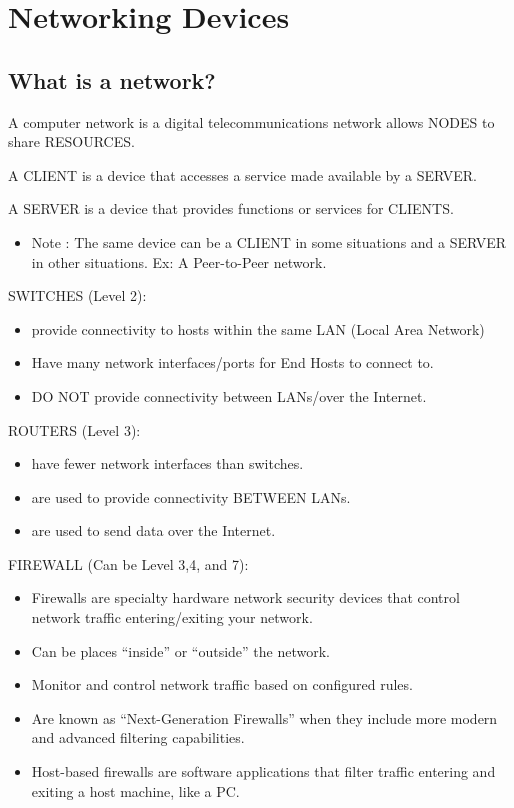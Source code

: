 \chapter{Networking Devices}\label{networking-devices}

\section{What is a network?}\label{what-is-a-network}

A computer network is a digital telecommunications network allows NODES
to share RESOURCES.

A CLIENT is a device that accesses a service made available by a SERVER.

A SERVER is a device that provides functions or services for CLIENTS.

\begin{itemize}
\tightlist
\item
  Note : The same device can be a CLIENT in some situations and a SERVER
  in other situations. Ex: A Peer-to-Peer network.
\end{itemize}

SWITCHES (Level 2):

\begin{itemize}
\tightlist
\item
  provide connectivity to hosts within the same LAN (Local Area Network)
\item
  Have many network interfaces/ports for End Hosts to connect to.
\item
  DO NOT provide connectivity between LANs/over the Internet.
\end{itemize}

ROUTERS (Level 3):

\begin{itemize}
\tightlist
\item
  have fewer network interfaces than switches.
\item
  are used to provide connectivity BETWEEN LANs.
\item
  are used to send data over the Internet.
\end{itemize}

FIREWALL (Can be Level 3,4, and 7):

\begin{itemize}
\tightlist
\item
  Firewalls are specialty hardware network security devices that control
  network traffic entering/exiting your network.
\item
  Can be places ``inside'' or ``outside'' the network.
\item
  Monitor and control network traffic based on configured rules.
\item
  Are known as ``Next-Generation Firewalls'' when they include more
  modern and advanced filtering capabilities.
\item
  Host-based firewalls are software applications that filter traffic
  entering and exiting a host machine, like a PC.
\end{itemize}
